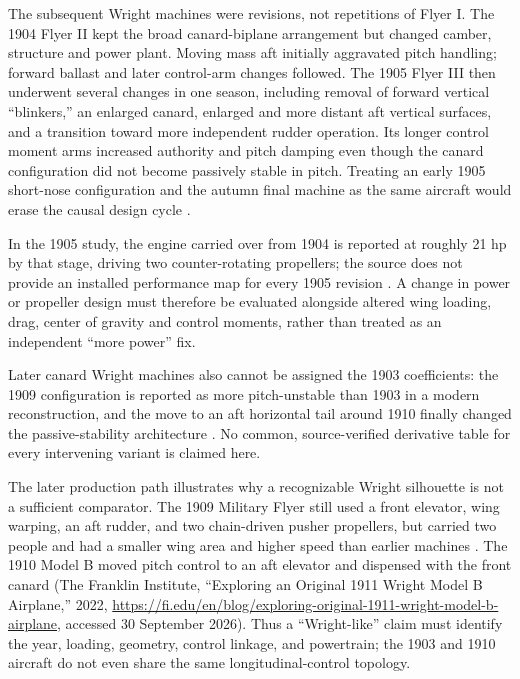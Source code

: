 \documentclass[10pt,letterpaper]{article}
\begin{document}
The subsequent Wright machines were revisions, not repetitions of Flyer I.
The 1904 Flyer II kept the broad canard-biplane arrangement but changed
camber, structure and power plant. Moving mass aft initially aggravated
pitch handling; forward ballast and later control-arm changes followed.
The 1905 Flyer III then underwent several changes in one season, including
removal of forward vertical ``blinkers,'' an enlarged canard, enlarged and
more distant aft vertical surfaces, and a transition toward more independent
rudder operation. Its longer control moment arms increased authority and
pitch damping even though the canard configuration did not become passively
stable in pitch. Treating an early 1905 short-nose configuration and the
autumn final machine as the same aircraft would erase the causal design
cycle \cite{ref41,ref42,ref10}.

In the 1905 study, the engine carried over from 1904 is reported at roughly
21 hp by that stage, driving two counter-rotating propellers; the source
does not provide an installed performance map for every 1905 revision
\cite{ref10}. A change in power or propeller design must therefore be
evaluated alongside altered wing loading, drag, center of gravity and
control moments, rather than treated as an independent ``more power'' fix.

Later canard Wright machines also cannot
be assigned the 1903 coefficients: the 1909 configuration is reported as
more pitch-unstable than 1903 in a modern reconstruction, and the move to
an aft horizontal tail around 1910 finally changed the passive-stability
architecture \cite{ref41}. No common, source-verified derivative table for
every intervening variant is claimed here.

The later production path illustrates why a recognizable Wright silhouette
is not a sufficient comparator. The 1909 Military Flyer still used a front
elevator, wing warping, an aft rudder, and two chain-driven pusher
propellers, but carried two people and had a smaller wing area and higher
speed than earlier machines \cite{ref44}. The 1910 Model B moved pitch
control to an aft elevator and dispensed with the front canard
\cite{ref41} (The Franklin Institute, ``Exploring an Original 1911 Wright Model B Airplane,'' 2022, \url{https://fi.edu/en/blog/exploring-original-1911-wright-model-b-airplane}, accessed 30 September 2026). Thus a ``Wright-like'' claim must identify the year,
loading, geometry, control linkage, and powertrain; the 1903 and 1910
aircraft do not even share the same longitudinal-control topology.
\end{document}
